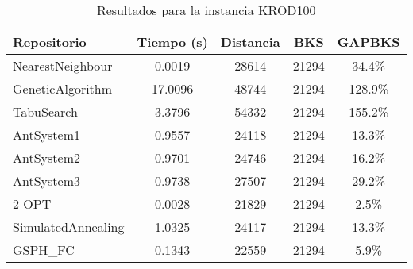 \begin{table}[H]
\centering
\caption{Resultados para la instancia KROD100}
\begin{tabular}{|l|c|c|c|c|}
\hline
\textbf{Repositorio} & \textbf{Tiempo (s)} & \textbf{Distancia} & \textbf{BKS} & \textbf{GAPBKS} \\ 
\hline
NearestNeighbour & 0.0019 & 28614 & 21294 & 34.4\% \\ 
GeneticAlgorithm & 17.0096 & 48744 & 21294 & 128.9\% \\ 
TabuSearch & 3.3796 & 54332 & 21294 & 155.2\% \\ 
AntSystem1 & 0.9557 & 24118 & 21294 & 13.3\% \\ 
AntSystem2 & 0.9701 & 24746 & 21294 & 16.2\% \\ 
AntSystem3 & 0.9738 & 27507 & 21294 & 29.2\% \\ 
2-OPT & 0.0028 & 21829 & 21294 & 2.5\% \\ 
SimulatedAnnealing & 1.0325 & 24117 & 21294 & 13.3\% \\ 
GSPH_FC & 0.1343 & 22559 & 21294 & 5.9\% \\ 
\hline
\end{tabular}
\end{table}
